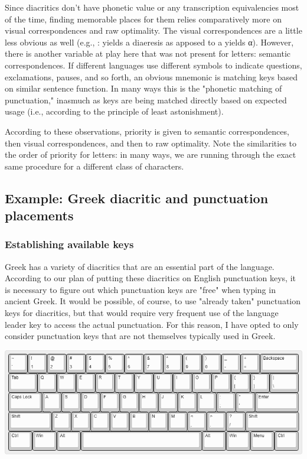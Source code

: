 \documentclass[11pt]{article}
\begin{document}
Since diacritics don't have phonetic value or any transcription equivalencies most of the time, finding memorable places for them relies comparatively more on visual correspondences and raw optimality. The visual correspondences are a little less obvious as well (e.g., : yields a diaeresis as apposed to a yields α). However, there is another variable at play here that was not present for letters: semantic correspondences. If different languages use different symbols to indicate questions, exclamations, pauses, and so forth, an obvious mnemonic is matching keys based on similar sentence function. In many ways this is the "phonetic matching of punctuation," inasmuch as keys are being matched directly based on expected usage (i.e., according to the principle of least astonishment).

According to these observations, priority is given to semantic correspondences, then visual correspondences, and then to raw optimality. Note the similarities to the order of priority for letters: in many ways, we are running through the exact same procedure for a different class of characters.

\subsection{Example: Greek diacritic and punctuation placements}
\label{sec:org5f802e2}

\subsubsection{Establishing available keys}
\label{sec:org57b0d1c}

Greek has a variety of diacritics that are an essential part of the language. According to our plan of putting these diacritics on English punctuation keys, it is necessary to figure out which punctuation keys are "free" when typing in ancient Greek. It would be possible, of course, to use "already taken" punctuation keys for diacritics, but that would require very frequent use of the language leader key to access the actual punctuation. For this reason, I have opted to only consider punctuation keys that are not themselves typically used in Greek.

\begin{center}
\includegraphics[width=.9\linewidth]{./images/base.png}
\end{center}
\end{document}
